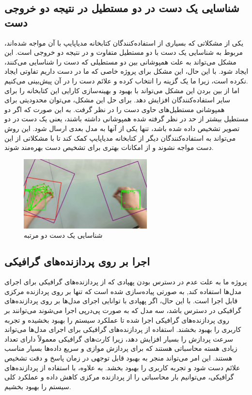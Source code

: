 \subsection{شناسایی یک دست در دو مستطیل در نتیجه دو خروجی دست}
یکی از مشکلاتی که بسیاری از استفاده‌کنندگان کتابخانه مدیاپایپ با آن مواجه شده‌اند، مربوط به شناسایی یک دست با دو مستطیل متفاوت و در نتیجه دو خروجی است. این مشکل می‌تواند به علت همپوشانی بین دو مستطیلی که دست را 
شناسایی می‌کنند، ایجاد شود. با این حال، این مشکل برای پروژه خاصی که ما در دست داریم تفاوتی ایجاد نکرده است، زیرا ما یک گزینه را انتخاب کرده و علائم دست را در آن پیش‌بینی می‌کنیم.
\\
اما از بین بردن این مشکل می‌تواند با بهبود و بهینه‌سازی کارایی این کتابخانه را برای سایر استفاده‌کنندگان افزایش دهد. برای حل این مشکل، می‌توان محدودیتی برای همپوشانی مستطیل‌های حاوی دست را در نظر گرفت. به این صورت که اگر دو مستطیل بیشتر از حد در نظر گرفته شده 
همپوشانی داشته باشند، یعنی یک دست در دو تصویر تشخیص داده شده باشد، تنها یکی از آنها به مدل بعدی ارسال شود. این روش می‌تواند به استفاده‌کنندگان دیگر از کتابخانه مدیاپایپ کمک کند تا با مشکلاتی از این دست مواجه نشوند و از امکانات بهتری برای تشخیص دست بهره‌مند شوند.

\begin{figure}[h]
    \centering
    \includegraphics[width=0.6\textwidth]{multi_boxes.png}
    \caption{شناسایی یک دست دو مرتبه}
\end{figure}


\subsection{اجرا بر روی پردازنده‌های گرافیکی }
پروژه ما  به علت عدم در دسترس بودن پهپادی که از پردازنده‌های گرافیکی برای اجرای مدل‌ها استفاده کند, به صورتی پیاده‌سازی شده است که تنها بر روی پردازنده مرکزی قابل اجرا است. با این حال، اگر پهپادی با توانایی اجرای مدل‌ها بر روی 
پردازنده‌های گرافیکی در دسترس باشد، سه مدل که به صورت پی‌در‌پی اجرا می‌شوند می‌توانند بر روی پردازنده‌های گرافیکی اجرا شده تا عملکرد سیستم را بهبود بخشیده و تجربه کاربری را بهبود بخشند. استفاده از پردازنده‌های گرافیکی برای اجرای مدل‌ها می‌تواند 
سرعت پردازش را بسیار افزایش دهد، زیرا کارت‌های گرافیکی معمولاً دارای تعداد زیادی هسته محاسباتی هستند که برای پردازش موازی و سریع داده‌ها بسیار مناسب هستند. این امر می‌تواند منجر به بهبود قابل توجهی در زمان پاسخ و دقت 
تشخیص علائم دست شود و تجربه کاربری را بهبود بخشد. به علاوه، با استفاده از پردازنده‌های گرافیکی، می‌توانیم بار محاسباتی را از پردازنده مرکزی کاهش داده و عملکرد کلی سیستم را بهبود بخشیم.

